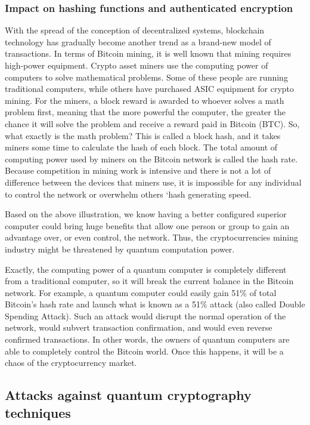 \documentclass[sigconf]{acmart}
\begin{document}
\subsubsection{Impact on hashing functions and authenticated encryption}
With the spread of the conception of decentralized systems, blockchain technology has gradually become another trend as a brand-new model of transactions. In terms of Bitcoin mining, it is well known that mining requires high-power equipment. Crypto asset miners use the computing power of computers to solve mathematical problems. Some of these people are running traditional computers, while others have purchased ASIC equipment for crypto mining. For the miners, a block reward is awarded to whoever solves a math problem first, meaning that the more powerful the computer, the greater the chance it will solve the problem and receive a reward paid in Bitcoin (BTC). So, what exactly is the math problem? This is called a block hash, and it takes miners some time to calculate the hash of each block. The total amount of computing power used by miners on the Bitcoin network is called the hash rate. Because competition in mining work is intensive and there is not a lot of difference between the devices that miners use, it is impossible for any individual to control the network or overwhelm others ‘hash generating speed.

Based on the above illustration, we know having a better configured superior computer could bring huge benefits that allow one person or group to gain an advantage over, or even control, the network. Thus, the cryptocurrencies mining industry might be threatened by quantum computation power.

Exactly, the computing power of a quantum computer is completely different from a traditional computer, so it will break the current balance in the Bitcoin network. For example, a quantum computer could easily gain 51\% of total Bitcoin's hash rate and launch what is known as a 51\% attack (also called Double Spending Attack). Such an attack would disrupt the normal operation of the network, would subvert transaction confirmation, and would even reverse confirmed transactions. In other words, the owners of quantum computers are able to completely control the Bitcoin world. Once this happens, it will be a chaos of the cryptocurrency market. 

\subsection{Attacks against quantum cryptography techniques}
\end{document}
